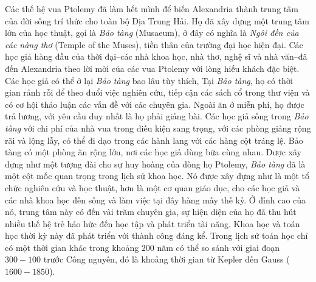\begin{multicols}{2}
	\vskip 0.1cm
	Các thế hệ vua Ptolemy đã làm hết mình để biến Alexandria thành trung tâm của đời sống trí thức cho toàn bộ Địa Trung Hải. Họ đã xây dựng một trung tâm lớn của học thuật, gọi là \textit{Bảo tàng} (Musaeum), ở đây có nghĩa là \textit{Ngôi đền của các nàng thơ} (Temple of the Muses), tiền thân của trường đại học hiện đại. Các học giả hàng đầu của thời đại--các nhà khoa học, nhà thơ, nghệ sĩ và nhà văn--đã đến Alexandria theo lời mời của các vua Ptolemy với lòng hiếu khách đặc biệt. Các học giả có thể ở lại \textit{Bảo tàng} bao lâu tùy thích, Tại \textit{Bảo tàng}, họ có thời gian rảnh rỗi để theo đuổi việc nghiên cứu, tiếp cận các sách cổ trong thư viện và có cơ hội thảo luận các vấn đề với các chuyên gia.  Ngoài ăn ở miễn phí, họ được trả lương, với yêu cầu duy nhất là họ phải giảng bài. Các học giả sống trong \textit{Bảo tàng} với chi phí của nhà vua trong điều kiện sang trọng, với các phòng giảng rộng rãi và lộng lẫy, có thể đi dạo trong các hành lang với các hàng cột tráng lệ. Bảo tàng có một phòng ăn rộng lớn, nơi các học giả dùng bữa cùng nhau. 
	\vskip 0.1cm
	Được xây dựng như một tượng đài cho sự huy hoàng của dòng họ Ptolemy, \textit{Bảo tàng} đã là một cột mốc quan trọng trong lịch sử khoa học. Nó được xây dựng như là một tổ chức nghiên cứu và học thuật, hơn là một cơ quan giáo dục, cho các học giả và các nhà khoa học đến sống và làm việc tại đây hàng mấy thế kỷ. Ở đỉnh cao của nó, trung tâm này có đến vài trăm chuyên gia, sự hiện diện của họ đã thu hút nhiều thế hệ trẻ háo hức đến học tập và phát triển tài năng. Khoa học và toán học thời kỳ này đã phát triển với thành công đáng kể. Trong lịch sử toán học chỉ có một thời gian khác trong khoảng $200$ năm có thể so sánh với giai đoạn $300-100$ trước Công nguyên, đó là khoảng thời gian từ Kepler đến Gauss ($1600-1850$).
	\begin{figure}[H]
		\vspace*{-10pt}
		\centering
		\captionsetup{labelformat= empty, justification=centering}

\end{figure}
\end{multicols}
